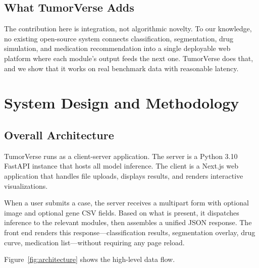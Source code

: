 \documentclass[conference]{IEEEtran}
\begin{document}
\subsection{What TumorVerse Adds}
The contribution here is integration, not algorithmic novelty. To our knowledge, no existing open-source system connects classification, segmentation, drug simulation, and medication recommendation into a single deployable web platform where each module's output feeds the next one. TumorVerse does that, and we show that it works on real benchmark data with reasonable latency.

\section{System Design and Methodology}

\subsection{Overall Architecture}

TumorVerse runs as a client-server application. The server is a Python 3.10 FastAPI instance that hosts all model inference. The client is a Next.js web application that handles file uploads, displays results, and renders interactive visualizations.

When a user submits a case, the server receives a multipart form with optional image and optional gene CSV fields. Based on what is present, it dispatches inference to the relevant modules, then assembles a unified JSON response. The front end renders this response—classification results, segmentation overlay, drug curve, medication list—without requiring any page reload.

Figure~\ref{fig:architecture} shows the high-level data flow.
\end{document}
